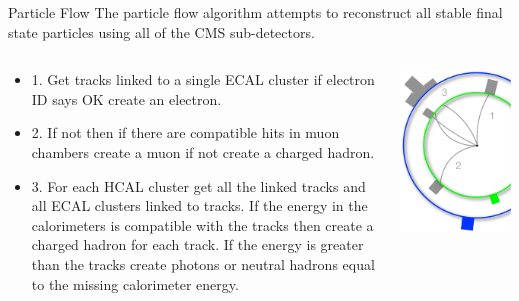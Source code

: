 \begin{frame}{Particle Flow}
The particle flow algorithm attempts to reconstruct all stable final state particles using all of the CMS sub-detectors.

\begin{columns}[T]
  \begin{column}{0.6\textwidth}
\footnotesize
    \begin{itemize}
\footnotesize
    \item
      1. Get tracks linked to a single ECAL cluster if electron ID says OK create an electron.
    \item
      2. If not then if there are compatible hits in muon chambers create a muon if not create a charged hadron.
    \item
      3. For each HCAL cluster get all the linked tracks and all ECAL clusters linked to tracks. If the energy in the calorimeters is compatible with the tracks then create a charged hadron for each track.  If the energy is greater than the tracks create photons or neutral hadrons equal to the missing calorimeter energy.
    \end{itemize}
  \end{column}
  \begin{column}{0.40\textwidth}
    \includegraphics[width=0.99\textwidth]{images/pf3.pdf}
  \end{column}
\end{columns}
\end{frame}

